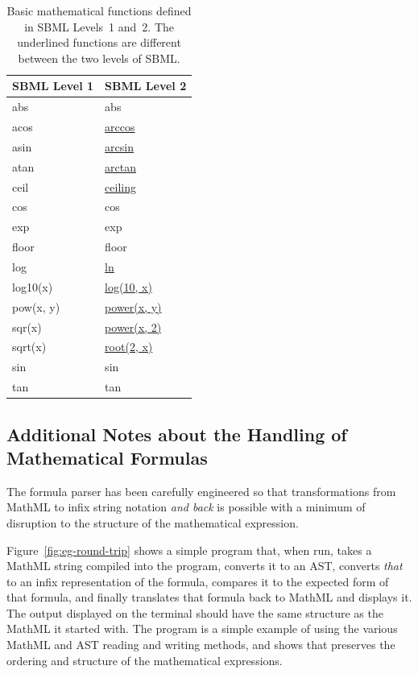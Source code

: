 \documentclass{sbmlmanual}
\begin{document}
\begin{table}[bth]
  \small
  \centering
  \ttfamily
  \begin{tabular}{ll}
    \toprule
    \textrm{\textbf{SBML Level 1}} & \textrm{\textbf{SBML Level 2}} \\
    \midrule
    abs     & abs \\
    acos    & \underline{arccos} \\
    asin    & \underline{arcsin} \\
    atan    & \underline{arctan} \\
    ceil    & \underline{ceiling} \\
    cos     & cos \\
    exp     & exp \\
    floor   & floor \\
    log     & \underline{ln} \\
    log10(x) & \underline{log(10, x)} \\
    pow(x, y) &       \underline{power(x, y)} \\
    sqr(x)  & \underline{power(x, 2)} \\
    sqrt(x) & \underline{root(2, x)} \\
    sin     & sin \\
    tan     & tan \\
    \bottomrule
  \end{tabular}
  \caption{Basic mathematical functions defined in SBML Levels~1 and~2.
The underlined functions are different between the two levels of SBML.}
  \label{tab:function-names}
\end{table}

\subsection{Additional Notes about the Handling of Mathematical Formulas}
\label{sec:mathml-special-cases}

The \libsbml{} formula parser has been carefully engineered so that
transformations from MathML to infix string notation \emph{and back} is
possible with a minimum of disruption to the structure of the mathematical
expression.

Figure~\vref{fig:eg-round-trip} shows a simple program that, when run,
takes a MathML string compiled into the program, converts it to an AST,
converts \emph{that} to an infix representation of the formula, compares it
to the expected form of that formula, and finally translates that formula
back to MathML and displays it.  The output displayed on the terminal
should have the same structure as the MathML it started with.  The program
is a simple example of using the various MathML and AST reading and writing
methods, and shows that \libsbml{} preserves the ordering and structure of
the mathematical expressions.
\end{document}
